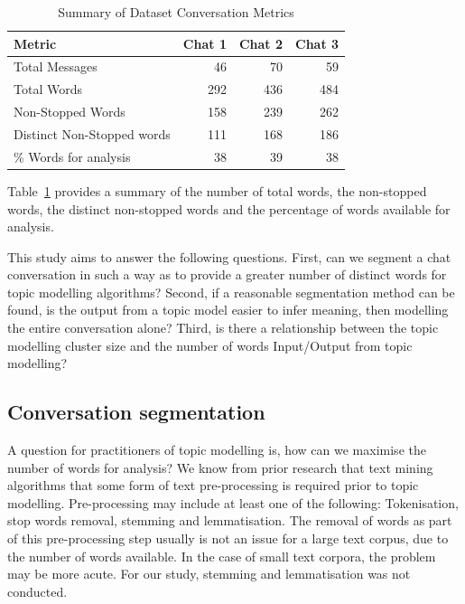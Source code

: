 \begin {table}[]
\caption {Summary of Dataset Conversation Metrics} 
\label{tab:chapt7_study1_tab1}
\begin{center}
\begin{tabular}{| p{5.5cm} | p{1.5cm} | p{1.5cm} | p{1.5cm} |} \hline
\textbf{Metric} & \textbf{Chat 1} & \textbf{Chat 2} & \textbf{Chat 3} 
\\ \hline Total Messages & \multicolumn{0}{|r|}{46} & \multicolumn{0}{|r|}{70} & \multicolumn{0}{|r|}{59}
\\ \hline Total Words & \multicolumn{0}{|r|}{292} & \multicolumn{0}{|r|}{436} & \multicolumn{0}{|r|}{484}
\\ \hline Non-Stopped Words & \multicolumn{0}{|r|}{158} & \multicolumn{0}{|r|}{239} & \multicolumn{0}{|r|}{262}
\\ \hline Distinct Non-Stopped words & \multicolumn{0}{|r|}{111} & \multicolumn{0}{|r|}{168} & \multicolumn{0}{|r|}{186}
\\ \hline \% Words for analysis & \multicolumn{0}{|r|}{38} & \multicolumn{0}{|r|}{39} & \multicolumn{0}{|r|}{38} 
\\ \hline
\end{tabular}
\end{center}
\end{table}


Table~\ref{tab:chapt7_study1_tab1} provides a summary of the number of total words, the non-stopped words, the distinct non-stopped words and the percentage of words available for analysis. 

This study aims to answer the following questions. First, can we segment a chat conversation in such a way as to provide a greater number of distinct words for topic modelling algorithms? Second, if a reasonable segmentation method can be found, is the output from a topic model easier to infer meaning, then modelling the entire conversation alone? Third, is there a relationship between the topic modelling cluster size and the number of words Input/Output from topic modelling? 

\subsection{Conversation segmentation}

A question for practitioners of topic modelling is, how can we maximise the number of words for analysis? We know from prior research that text mining algorithms that some form of text pre-processing is required prior to topic modelling. Pre-processing may include at least one of the following: Tokenisation, stop words removal, stemming and lemmatisation. The removal of words as part of this pre-processing step usually is not an issue for a large text corpus, due to the number of words available. In the case of small text corpora, the problem may be more acute. For our study, stemming and lemmatisation was not conducted.

